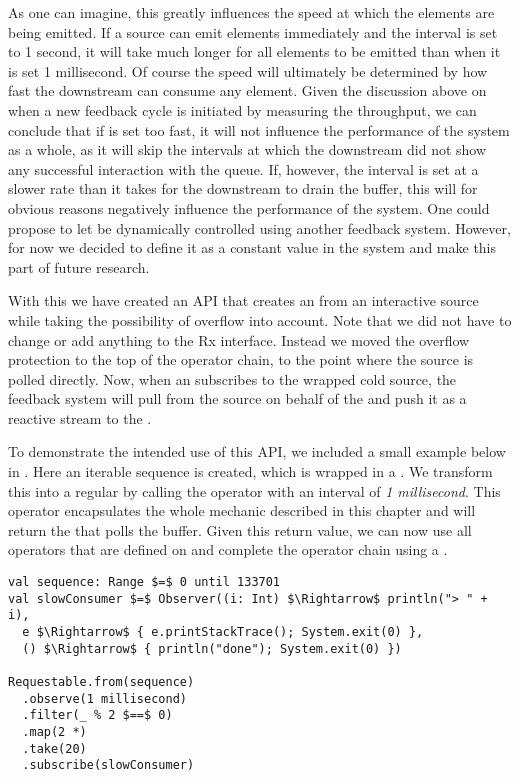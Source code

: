 As one can imagine, this greatly influences the speed at which the elements are being emitted. If a source can emit elements immediately and the interval is set to 1 second, it will take much longer for all elements to be emitted than when it is set 1 millisecond. Of course the speed will ultimately be determined by how fast the downstream can consume any element. Given the discussion above on when a new feedback cycle is initiated by measuring the throughput, we can conclude that if  is set too fast, it will not influence the performance of the system as a whole, as it will skip the intervals at which the downstream did not show any successful interaction with the queue. If, however, the interval is set at a slower rate than it takes for the downstream to drain the buffer, this will for obvious reasons negatively influence the performance of the system. One could propose to let  be dynamically controlled using another feedback system. However, for now we decided to define it as a constant value in the system and make this part of future research.

With this we have created an API that creates an \obs from an interactive source while taking the possibility of overflow into account. Note that we did not have to change or add anything to the Rx interface. Instead we moved the overflow protection to the top of the operator chain, to the point where the source is polled directly. Now, when an \obv subscribes to the wrapped cold source, the feedback system will pull from the source on behalf of the \obv and push it as a reactive stream to the \obv.

To demonstrate the intended use of this API, we included a small example below in . Here an iterable sequence is created, which is wrapped in a . We transform this into a regular \obs by calling the  operator with an interval of \textit{1 millisecond}. This operator encapsulates the whole mechanic described in this chapter and will return the \obs that polls the buffer. Given this return value, we can now use all operators that are defined on \obs and complete the operator chain using a .

\hspace*{-\parindent}
\begin{minipage}{\linewidth}
\begin{lstlisting}[style=ScalaStyle, caption={Using the Requestable API to control the flow of a source}, label={lst:requestable-api-usage}]
val sequence: Range $=$ 0 until 133701
val slowConsumer $=$ Observer((i: Int) $\Rightarrow$ println("> " + i),
  e $\Rightarrow$ { e.printStackTrace(); System.exit(0) },
  () $\Rightarrow$ { println("done"); System.exit(0) })
		
Requestable.from(sequence)
  .observe(1 millisecond)
  .filter(_ % 2 $==$ 0)
  .map(2 *)
  .take(20)
  .subscribe(slowConsumer)
\end{lstlisting}
\end{minipage}
